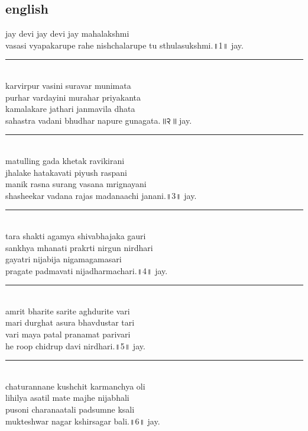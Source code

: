 \documentclass[letterpaper,twocolumn,openany,nodeprecatedcode]{dndbook}
\begin{document}
\begin{flushleft}
  \subsection*{english}
  jay devi jay devi jay mahalakshmi \\ vasasi vyapakarupe rahe nishchalarupe tu sthulasukshmi.॥1॥ jay. \\
  \rule{\linewidth}{1pt} \\
  karvirpur vasini suravar munimata \\ purhar vardayini murahar priyakanta \\ kamalakare jathari janmavila dhata \\ sahastra vadani bhudhar napure gunagata.॥२॥ jay. \\
  \rule{\linewidth}{1pt} \\
  matulling gada khetak ravikirani \\ jhalake hatakavati piyush raspani \\ manik rasna surang vasana mrignayani \\ shasheekar vadana rajas madanaachi janani.॥3॥ jay. \\
  \rule{\linewidth}{1pt} \\
  tara shakti agamya shivabhajaka gauri \\ sankhya mhanati prakrti nirgun nirdhari \\ gayatri nijabija nigamagamasari \\ pragate padmavati nijadharmachari.॥4॥ jay. \\
  \rule{\linewidth}{1pt} \\
  amrit bharite sarite aghdurite vari \\ mari durghat asura bhavdustar tari \\ vari maya patal pranamat parivari \\ he roop chidrup davi nirdhari.॥5॥ jay. \\
  \rule{\linewidth}{1pt} \\
  chaturannane kushchit karmanchya oli \\ lihilya asatil mate majhe nijabhali \\ pusoni charanaatali padsumne ksali \\ mukteshwar nagar kshirsagar bali.॥6॥ jay. \\
\end{flushleft}
\pagebreak
\end{document}
